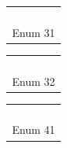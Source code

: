 \begin{flushleft}
\begin{tabular}[t]{|c|c|c|c|c|}
  \hline
  & & & &  \\
  \hline
  & \cellcolor{blue}& & \cellcolor{blue}&  \\
  \hline
  & \cellcolor{blue} &\cellcolor{blue}  & \cellcolor{blue} &   \\
  \hline
  & \cellcolor{blue}& &\cellcolor{blue} &  \\
  \hline
  & & & &  \\
  \hline
  \multicolumn{5}{c}{Enum 31}\\
\end{tabular}
\hspace{3cm}
\begin{tabular}[t]{|c|c|c|c|c|}
  \hline
  & & & &  \\
  \hline
  & \cellcolor{blue}&  \cellcolor{blue}& \cellcolor{blue}&  \\
  \hline
  & & \cellcolor{blue} & &  \\
  \hline
  &\cellcolor{blue} & \cellcolor{blue} & \cellcolor{blue} &  \\
  \hline
  & & & &  \\
  \hline
  \multicolumn{5}{c}{Enum 32}\\
\end{tabular}
\hspace{3cm}
\begin{tabular}[t]{|c|c|c|c|c|}
  \hline
  & & & &  \\
  \hline
  & \cellcolor{blue}& & &  \\
  \hline
  &  \cellcolor{blue}&  &  &   \\
  \hline
  & \cellcolor{blue}& \cellcolor{blue}& &  \\
  \hline
  & & & &  \\
  \hline
  \multicolumn{5}{c}{Enum 41}\\
\end{tabular}
\end{flushleft}
